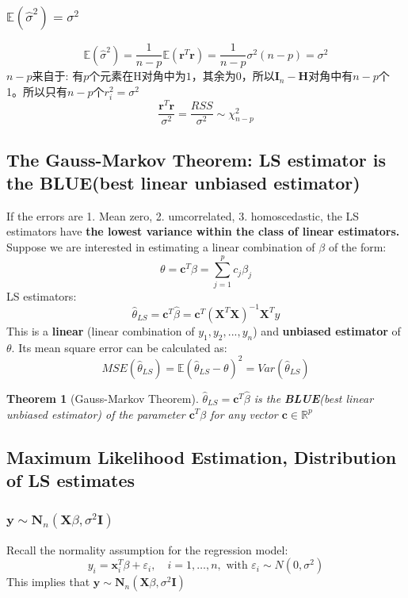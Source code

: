 \documentclass[11pt,a4paper]{article}
\newtheorem{theorem}{Theorem}
\begin{document}
\subsubsection{$\mathbb{E}(\hat{\sigma}^2)=\sigma^2$}
$$\mathbb{E}(\hat{\sigma}^2)=\frac{1}{n-p}\mathbb{E}(\mathbf{r}^T \mathbf{r})=\frac{1}{n-p}\sigma^2(n-p)=\sigma^2$$
$n-p$来自于: 有$p$个元素在H对角中为$1$，其余为$0$，所以$\mathbf{I}_n-\mathbf{H}$对角中有$n-p$个1。所以只有$n-p$个$r_i^2=\sigma^2$
$$\frac{\mathbf{r}^T \mathbf{r}}{\sigma^2}=\frac{RSS}{\sigma^2}\sim \chi^2_{n-p}$$

\subsection{The Gauss-Markov Theorem: LS estimator is the \textbf{BLUE}(best linear unbiased estimator)}
If the errors are 1. Mean zero, 2. umcorrelated, 3. homoscedastic, the LS estimators have \textbf{the lowest variance within the class of linear estimators.}\\
Suppose we are interested in estimating a linear combination of $\beta$ of the form:
$$\theta=\mathbf{c}^T\beta=\sum_{j=1}^pc_j\beta_j$$
LS estimators:
$$\hat{\theta}_{LS}=\mathbf{c}^T\hat{\beta}=\mathbf{c}^T \left(\mathbf{X}^{T} \mathbf{X}\right)^{-1} \mathbf{X}^{T} y$$
This is a \textbf{linear} (linear combination of $y_1,y_2,...,y_n$) and \textbf{unbiased estimator} of $\theta$. Its mean square error can be calculated as:
$$
MSE( \hat{\theta}_{LS} ) = \mathbb{E}( \hat{\theta}_{LS} − \theta)^2 = Var( \hat{\theta}_{LS})$$
\begin{theorem}[Gauss-Markov Theorem]
    $\hat{\theta}_{LS}=\mathbf{c}^T\hat{\beta}$ is the \textbf{BLUE}(best linear unbiased estimator) of the parameter $\mathbf{c}^T\beta$ for any vector $\mathbf{c}\in \mathbb{R}^p$
\end{theorem}

\subsection{Maximum Likelihood Estimation, Distribution of LS estimates}
\subsubsection{$\mathbf{y} \sim \mathbf{N}_{n}\left(\mathbf{X} \beta, \sigma^{2} \mathbf{I}\right)$}
Recall the normality assumption for the regression model:
$$
y_{i}=\mathbf{x}_{i}^{T} \beta+\varepsilon_{i},\quad i=1, \ldots, n, \text { with } \varepsilon_{i} \sim N\left(0, \sigma^{2}\right)
$$
This implies that $\mathbf{y} \sim \mathbf{N}_{n}\left(\mathbf{X} \beta, \sigma^{2} \mathbf{I}\right)$
\end{document}
